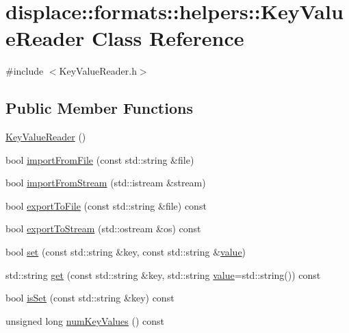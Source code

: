 \hypertarget{classdisplace_1_1formats_1_1helpers_1_1_key_value_reader}{}\section{displace\+::formats\+::helpers\+::Key\+Value\+Reader Class Reference}
\label{classdisplace_1_1formats_1_1helpers_1_1_key_value_reader}


{\ttfamily \#include $<$Key\+Value\+Reader.\+h$>$}

\subsection*{Public Member Functions}
\begin{DoxyCompactItemize}
\item 
\mbox{\hyperlink{classdisplace_1_1formats_1_1helpers_1_1_key_value_reader_a6a88deed0ee75804fb467c07afde6b01}{Key\+Value\+Reader}} ()
\item 
bool \mbox{\hyperlink{classdisplace_1_1formats_1_1helpers_1_1_key_value_reader_a50bac6d703850be2a6a3037ccef894f9}{import\+From\+File}} (const std\+::string \&file)
\item 
bool \mbox{\hyperlink{classdisplace_1_1formats_1_1helpers_1_1_key_value_reader_a94d113097dc2c4078c958ab360a8f817}{import\+From\+Stream}} (std\+::istream \&stream)
\item 
bool \mbox{\hyperlink{classdisplace_1_1formats_1_1helpers_1_1_key_value_reader_a384f0414019b2e321b88b8486035b6bf}{export\+To\+File}} (const std\+::string \&file) const
\item 
bool \mbox{\hyperlink{classdisplace_1_1formats_1_1helpers_1_1_key_value_reader_abd96e1d77d72213690a7bd2e0300746c}{export\+To\+Stream}} (std\+::ostream \&os) const
\item 
bool \mbox{\hyperlink{classdisplace_1_1formats_1_1helpers_1_1_key_value_reader_a962e698ee19e27561b976091adb246d6}{set}} (const std\+::string \&key, const std\+::string \&\mbox{\hyperlink{diffusion_8cpp_a4b41795815d9f3d03abfc739e666d5da}{value}})
\item 
std\+::string \mbox{\hyperlink{classdisplace_1_1formats_1_1helpers_1_1_key_value_reader_afebbcc62fdbc8baf1d98e3aeb3bfbc63}{get}} (const std\+::string \&key, std\+::string \mbox{\hyperlink{diffusion_8cpp_a4b41795815d9f3d03abfc739e666d5da}{value}}=std\+::string()) const
\item 
bool \mbox{\hyperlink{classdisplace_1_1formats_1_1helpers_1_1_key_value_reader_a4e6e237b4e8a72221ac86f2b502af706}{is\+Set}} (const std\+::string \&key) const
\item 
unsigned long \mbox{\hyperlink{classdisplace_1_1formats_1_1helpers_1_1_key_value_reader_a95be414e3f72631a7648392d697d4704}{num\+Key\+Values}} () const
\end{DoxyCompactItemize}


